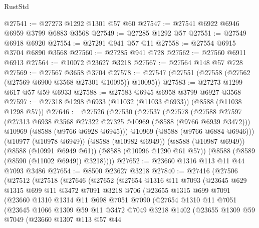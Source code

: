 \begin{lexlean}{RustStd}
\begin{coremodule}
@27541 := @27273 @1292 @1301 @57 @60
@27547 := @27541 @6922 @6946 @6959 @3799 @6883 @3568
@27549 := @27285 @1292 @57
@27551 := @27549 @6918 @6920
@27554 := @27291 @941 @57 @11
@27558 := @27554 @6915 @3704 @6890 @3568
@27560 := @27285 @941 @728
@27562 := @27560 @6911 @6913
@27564 := @10072 @23627 @3218
@27567 := @27564 @148 @57 @728
@27569 := @27567 @3658 @3704
@27578 := @27547 (@27551 (@27558 (@27562 (@27569 @6900 @3568 @27301 @10095)) @10095))
@27583 := @27273 @1299 @617 @57 @59 @6933
@27588 := @27583 @6945 @6958 @3799 @6927 @3568
@27597 := @27318 @1298 @6933 (@11032 (@11033 @6933)) (@8588 (@11038 @1298 @57))
@27646 := @27526
    (@27530
      (@27537
        (@27578
          (@27588
            @27597
            (@27313 @6938 @3568 @27322 @27325 @10969 (@8588 (@9766 @6939 @3472)))
            @10969
            (@8588 (@9766 @6928 @6945)))
          @10969
          (@8588 (@9766 @6884 @6946)))
        (@10977 (@10978 @6949))
        (@8588 (@10982 @6949))
        (@8588 (@10987 @6949))
        (@8588 (@10991 @6949 @61))
        (@8588 (@10996 @1290 @61 @57))
        (@8588 (@8589 (@8590 (@11002 @6949)) @3218))))
@27652 := @23660 @1316 @113 @11 @44 @7093 @3486
@27654 := @8500 @23627 @3218
@27840 := @27416
    (@27506
      (@27512
        (@27518
          (@27646
            (@27652
              (@27654
                @1316
                @11
                @7093
                (@23645
                  @629
                  @1315
                  @699
                  @11
                  @3472
                  @7091
                  @3218
                  @706
                  (@23655
                    @1315
                    @699
                    @7091
                    (@23660
                      @1310
                      @1314
                      @11
                      @698
                      @7051
                      @7090
                      (@27654
                        @1310
                        @11
                        @7051
                        (@23645
                          @1066
                          @1309
                          @59
                          @11
                          @3472
                          @7049
                          @3218
                          @1402
                          (@23655
                            @1309
                            @59
                            @7049
                            (@23660
                              @1307
                              @113
                              @57
                              @44

\end{coremodule}
\end{lexlean}
